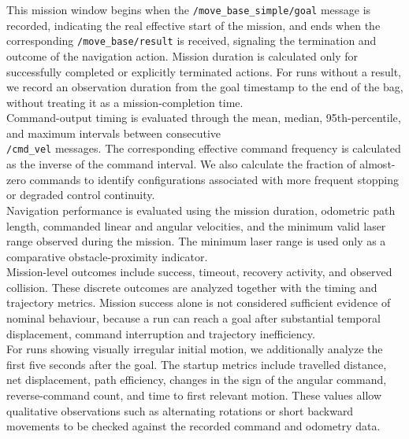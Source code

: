 This mission window begins when the \texttt{/move\_base\_simple/goal} message is recorded, indicating the real effective start of the mission, and ends when the corresponding \texttt{/move\_base/result} is received, signaling the termination and outcome of the navigation action. Mission duration is calculated only for successfully completed or explicitly terminated actions. For runs without a result, we record an observation duration from the goal timestamp to the end of the bag, without treating it as a mission-completion time.
\\
Command-output timing is evaluated through the mean, median, 95th-percentile, and maximum intervals between consecutive 
\\
\texttt{/cmd\_vel} messages. The corresponding effective command frequency is calculated as the inverse of the command interval. We also calculate the fraction of almost-zero commands to identify configurations associated with more frequent stopping or degraded control continuity.
\\
Navigation performance is evaluated using the mission duration, odometric path length, commanded linear and angular velocities, and the minimum valid laser range observed during the mission. The minimum laser range is used only as a comparative obstacle-proximity indicator.
\\
Mission-level outcomes include success, timeout, recovery activity, and observed collision. These discrete outcomes are analyzed together with the timing and trajectory metrics. Mission success alone is not considered sufficient evidence of nominal behaviour, because a run can reach a goal after substantial temporal displacement, command interruption and trajectory inefficiency.
\\
For runs showing visually irregular initial motion, we additionally analyze the first five seconds after the goal. The startup metrics include travelled distance, net displacement, path efficiency, changes in the sign of the angular command, reverse-command count, and time to first relevant motion. These values allow qualitative observations such as alternating rotations or short backward movements to be checked against the recorded command and odometry data.
